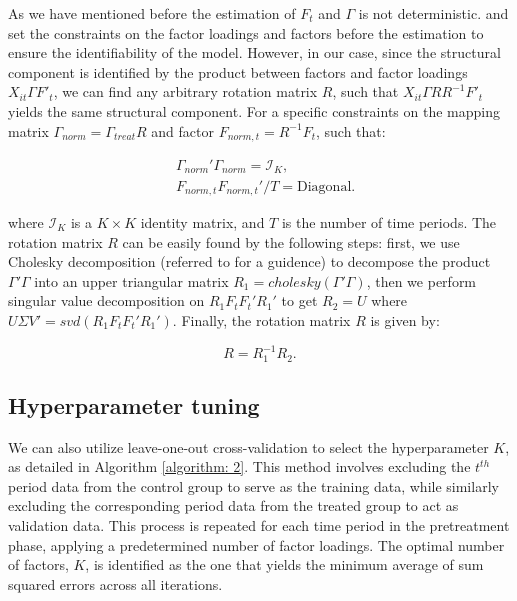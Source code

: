 \documentclass[12pt]{article}
\begin{document}
As we have mentioned before the estimation of $F_{t}$ and $\Gamma$ is not deterministic. \cite{bai2009panel} and \cite{xu2017generalized} set the constraints on the factor loadings and factors before the estimation to ensure the identifiability of the model. However, in our case, since the structural component is identified by the product between factors and factor loadings $X_{it}\Gamma F'_{t}$, we can find any arbitrary rotation matrix $R$, such that $X_{it}\Gamma R R^{-1}F'_{t}$ yields the same structural component. For a specific constraints on the mapping matrix $\Gamma_{norm} = \Gamma_{treat}R$ and factor $F_{norm, t} = R^{-1}F_t$, such that:

\begin{equation}
\begin{aligned}
& \Gamma_{norm}'\Gamma_{norm} = \mathcal{I}_K, \\
& F_{norm, t} F_{norm, t}'/T = \text{Diagonal}.
\end{aligned}
\end{equation}

where $\mathcal{I}_K$ is a $K \times K$ identity matrix, and $T$ is the number of time periods. The rotation matrix $R$ can be easily found by the following steps: first, we use Cholesky decomposition (referred to \cite{higham2009cholesky} for a guidence) to decompose the product $\Gamma' \Gamma$ into an upper triangular matrix $R_1 = cholesky(\Gamma' \Gamma)$, then we perform singular value decomposition on $R_1F_tF_t'R_1'$ to get $R_2 = U$ where $U\Sigma V'=svd(R_1F_tF_t'R_1')$. Finally, the rotation matrix $R$ is given by:

\begin{equation}
R = R_1^{-1}R_2.
\end{equation}

\subsection{Hyperparameter tuning}
\label{sec: appendix hyperparameter}
We can also utilize leave-one-out cross-validation to select the hyperparameter $K$, as detailed in Algorithm \ref{algorithm: 2}. This method involves excluding the $t^{th}$ period data from the control group to serve as the training data, while similarly excluding the corresponding period data from the treated group to act as validation data. This process is repeated for each time period in the pretreatment phase, applying a predetermined number of factor loadings. The optimal number of factors, $K$, is identified as the one that yields the minimum average of sum squared errors across all iterations.
\end{document}

